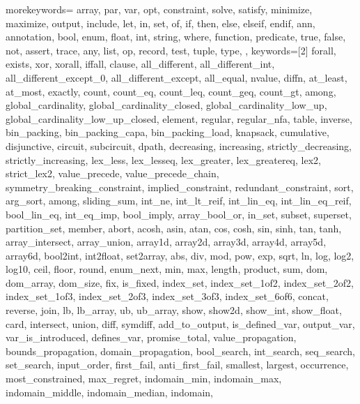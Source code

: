 \usepackage{listings}
\usepackage{courier} %

\newcommand\mznfont{\fontfamily{pcr}\selectfont}

{
  morekeywords={
  array, par, var, opt, constraint, solve, satisfy, minimize,
  maximize, output, include, let, in, set, of, if, then, else, elseif, endif,
  ann, annotation, bool, enum, float, int, string, where, function,
  predicate, true, false, not, assert, trace,
  any, list, op, record, test, tuple, type,
  },
  keywords=[2]{
  forall, exists, xor, xorall, iffall, clause,
  all_different, all_different_int,
  all_different_except_0, all_different_except, all_equal,
  nvalue, diffn,
  at_least, at_most, exactly, %
  count, count_eq, count_leq, count_geq, count_gt, among,
  global_cardinality, global_cardinality_closed,
  global_cardinality_low_up, global_cardinality_low_up_closed,
  element, regular, regular_nfa, table, inverse,
  bin_packing, bin_packing_capa, bin_packing_load, knapsack,
  cumulative, disjunctive, circuit, subcircuit, dpath,
  decreasing, increasing,
  strictly_decreasing, strictly_increasing,
  lex_less, lex_lesseq, lex_greater, lex_greatereq, lex2, strict_lex2,
  value_precede, value_precede_chain,
  symmetry_breaking_constraint, implied_constraint, redundant_constraint,
  sort, arg_sort, among, sliding_sum,
  int_ne, int_lt_reif, int_lin_eq, int_lin_eq_reif, bool_lin_eq, int_eq_imp,
  bool_imply, array_bool_or,
  in_set, subset, superset, partition_set, member,
  abort,
  acosh, asin, atan, cos, cosh, sin, sinh, tan, tanh,
  array_intersect, array_union,
  array1d, array2d, array3d, array4d, array5d, array6d,
  bool2int, int2float, set2array,
  abs, div, mod, pow, exp, sqrt, ln, log, log2, log10,
  ceil, floor, round,
  enum_next,
  min, max, length, product, sum,
  dom, dom_array, dom_size, fix, is_fixed,
  index_set, index_set_1of2, index_set_2of2,
  index_set_1of3, index_set_2of3, index_set_3of3, index_set_6of6,
  concat, reverse, join,
  lb, lb_array, ub, ub_array,
  show, show2d, show_int, show_float,
  card, intersect, union, diff, symdiff,
  add_to_output,
  is_defined_var, output_var, var_is_introduced, defines_var, promise_total,
  value_propagation, bounds_propagation, domain_propagation,
  bool_search, int_search, seq_search,
  set_search, input_order, first_fail, anti_first_fail, smallest,
  largest, occurrence, most_constrained, max_regret, indomain_min,
  indomain_max, indomain_middle, indomain_median, indomain,
}}
